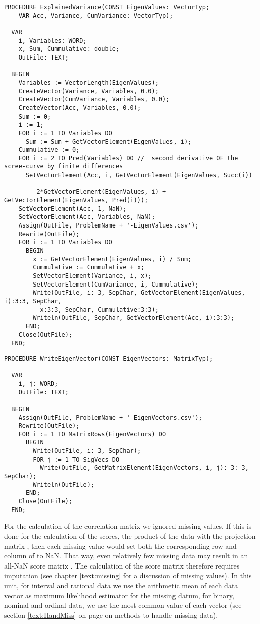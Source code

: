 \begin{lstlisting}[caption=Write eigenvalues and statistics to file]
  PROCEDURE ExplainedVariance(CONST EigenValues: VectorTyp;
    VAR Acc, Variance, CumVariance: VectorTyp);

  VAR
    i, Variables: WORD;
    x, Sum, Cummulative: double;
    OutFile: TEXT;

  BEGIN
    Variables := VectorLength(EigenValues);
    CreateVector(Variance, Variables, 0.0);
    CreateVector(CumVariance, Variables, 0.0);
    CreateVector(Acc, Variables, 0.0);
    Sum := 0;
    i := 1;
    FOR i := 1 TO Variables DO
      Sum := Sum + GetVectorElement(EigenValues, i);
    Cummulative := 0;
    FOR i := 2 TO Pred(Variables) DO //  second derivative OF the scree-curve by finite differences
      SetVectorElement(Acc, i, GetVectorElement(EigenValues, Succ(i)) -
         2*GetVectorElement(EigenValues, i) +  GetVectorElement(EigenValues, Pred(i)));
    SetVectorElement(Acc, 1, NaN);
    SetVectorElement(Acc, Variables, NaN);
    Assign(OutFile, ProblemName + '-EigenValues.csv');
    Rewrite(OutFile);
    FOR i := 1 TO Variables DO
      BEGIN
        x := GetVectorElement(EigenValues, i) / Sum;
        Cummulative := Cummulative + x;
        SetVectorElement(Variance, i, x);
        SetVectorElement(CumVariance, i, Cummulative);
        Write(OutFile, i: 3, SepChar, GetVectorElement(EigenValues, i):3:3, SepChar,
          x:3:3, SepChar, Cummulative:3:3);
        Writeln(OutFile, SepChar, GetVectorElement(Acc, i):3:3);
      END;
    Close(OutFile);
  END;
\end{lstlisting}

\begin{lstlisting}[caption=Write eigenvectors to file]
  PROCEDURE WriteEigenVector(CONST EigenVectors: MatrixTyp);

  VAR
    i, j: WORD;
    OutFile: TEXT;

  BEGIN
    Assign(OutFile, ProblemName + '-EigenVectors.csv');
    Rewrite(OutFile);
    FOR i := 1 TO MatrixRows(EigenVectors) DO
      BEGIN
        Write(OutFile, i: 3, SepChar);
        FOR j := 1 TO SigVecs DO
          Write(OutFile, GetMatrixElement(EigenVectors, i, j): 3: 3, SepChar);
        Writeln(OutFile);
      END;
    Close(OutFile);
  END;
\end{lstlisting}

For the calculation of the correlation matrix we ignored missing values. If this is done for the calculation of the scores, the product of the data with the projection matrix , then each missing value would set both the corresponding row and column of  to \acs{NaN}. That way, even relatively few missing data may result in an all-\acs{NaN} score matrix . The calculation of the score matrix therefore requires imputation (see chapter \ref{text:missing} for a discussion of missing values). In this unit, for interval and rational data we use the arithmetic mean of each data vector as maximum likelihood estimator for the missing datum, for binary, nominal and ordinal data, we use the most common value of each vector (see section \ref{text:HandMiss} on page \pageref{text:HandMiss} on methods to handle missing data).

